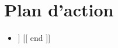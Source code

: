 \section{Plan d'action}

\begin{itemize}
[[ range .plan ]]
    \item [[ . ]]
[[ end ]]
\end{itemize}
